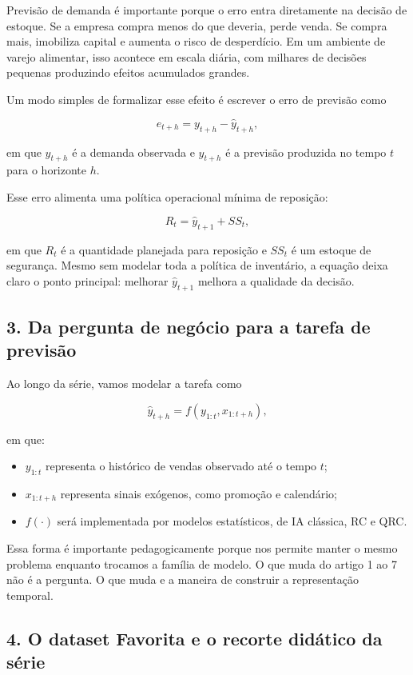 \documentclass[12pt]{article}
\providecommand{\tightlist}{%
          \setlength{\itemsep}{0pt}\setlength{\parskip}{0pt}}
\begin{document}
Previsão de demanda é importante porque o erro entra diretamente na decisão de estoque. Se a empresa compra menos do que deveria, perde venda. Se compra mais, imobiliza capital e aumenta o risco de desperdício. Em um ambiente de varejo alimentar, isso acontece em escala diária, com milhares de decisões pequenas produzindo efeitos acumulados grandes.

Um modo simples de formalizar esse efeito é escrever o erro de previsão como

\[
e_{t+h} = y_{t+h} - \hat{y}_{t+h},
\]

em que \(y_{t+h}\) é a demanda observada e \(\hat{y}_{t+h}\) é a previsão produzida no tempo \(t\) para o horizonte \(h\).

Esse erro alimenta uma política operacional mínima de reposição:

\[
R_t = \hat{y}_{t+1} + SS_t,
\]

em que \(R_t\) é a quantidade planejada para reposição e \(SS_t\) é um estoque de segurança. Mesmo sem modelar toda a política de inventário, a equação deixa claro o ponto principal: melhorar \(\hat{y}_{t+1}\) melhora a qualidade da decisão.

\subsection{3. Da pergunta de negócio para a tarefa de previsão}\label{3-da-pergunta-de-neguxf3cio-para-a-tarefa-de-previsuxe3o}

Ao longo da série, vamos modelar a tarefa como

\[
\hat{y}_{t+h} = f(y_{1:t}, x_{1:t+h}),
\]

em que:

\begin{itemize}
\tightlist
\item
  \(y_{1:t}\) representa o histórico de vendas observado até o tempo \(t\);
\item
  \(x_{1:t+h}\) representa sinais exógenos, como promoção e calendário;
\item
  \(f(\cdot)\) será implementada por modelos estatísticos, de IA clássica, RC e QRC.
\end{itemize}

Essa forma é importante pedagogicamente porque nos permite manter o mesmo problema enquanto trocamos a família de modelo. O que muda do artigo 1 ao 7 não é a pergunta. O que muda e a maneira de construir a representação temporal.

\subsection{4. O dataset Favorita e o recorte didático da série}\label{4-o-dataset-favorita-e-o-recorte-diduxe1tico-da-suxe9rie}
\end{document}
